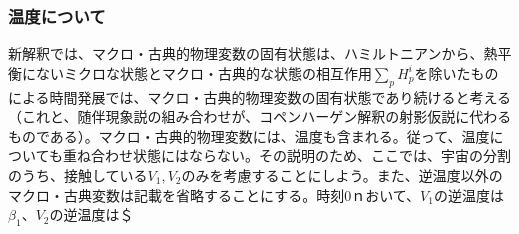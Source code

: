 \subsubsection{温度について}
新解釈では、マクロ・古典的物理変数の固有状態は、ハミルトニアンから、熱平衡にないミクロな状態とマクロ・古典的な状態の相互作用$\sum_pH_p^i$を除いたものによる時間発展では、マクロ・古典的物理変数の固有状態であり続けると考える（これと、随伴現象説の組み合わせが、コペンハーゲン解釈の射影仮説に代わるものである）。マクロ・古典的物理変数には、温度も含まれる。従って、温度についても重ね合わせ状態にはならない。その説明のため、ここでは、宇宙の分割のうち、接触している${V_1,V_2}$のみを考慮することにしよう。また、逆温度以外のマクロ・古典変数は記載を省略することにする。時刻$0$ｎおいて、$V_1$の逆温度は$\beta_1$、$V_2$の逆温度は＄
